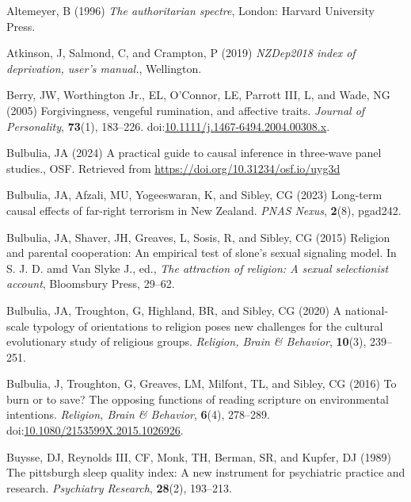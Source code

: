 \documentclass[
  single column]{article}
\newlength{\cslhangindent}
\newenvironment{CSLReferences}[2] %
 {\begin{list}{}{%
  \setlength{\itemindent}{0pt}
  \setlength{\leftmargin}{0pt}
  \setlength{\parsep}{0pt}
  \ifodd #1
   \setlength{\leftmargin}{\cslhangindent}
   \setlength{\itemindent}{-1\cslhangindent}
  \fi
  \setlength{\itemsep}{#2\baselineskip}}}
 {\end{list}}
\begin{document}
\label{refs}
\begin{CSLReferences}{1}{0}
Altemeyer, B (1996) \emph{The authoritarian spectre}, London: Harvard
University Press.

Atkinson, J, Salmond, C, and Crampton, P (2019) \emph{NZDep2018 index of
deprivation, user{'}s manual.}, Wellington.

Berry, JW, Worthington Jr., EL, O'Connor, LE, Parrott III, L, and Wade,
NG (2005) Forgivingness, vengeful rumination, and affective traits.
\emph{Journal of Personality}, \textbf{73}(1), 183--226.
doi:\href{https://doi.org/10.1111/j.1467-6494.2004.00308.x}{10.1111/j.1467-6494.2004.00308.x}.

Bulbulia, JA (2024) A practical guide to causal inference in three-wave
panel studies., OSF. Retrieved from
\url{https://doi.org/10.31234/osf.io/uyg3d}

Bulbulia, JA, Afzali, MU, Yogeeswaran, K, and Sibley, CG (2023)
Long-term causal effects of far-right terrorism in {N}ew {Z}ealand.
\emph{PNAS Nexus}, \textbf{2}(8), pgad242.

Bulbulia, JA, Shaver, JH, Greaves, L, Sosis, R, and Sibley, CG (2015)
Religion and parental cooperation: An empirical test of slone's sexual
signaling model. In S. J. D. amd Van Slyke J., ed., \emph{The attraction
of religion: A sexual selectionist account}, Bloomsbury Press, 29--62.

Bulbulia, JA, Troughton, G, Highland, BR, and Sibley, CG (2020) A
national-scale typology of orientations to religion poses new challenges
for the cultural evolutionary study of religious groups. \emph{Religion,
Brain \& Behavior}, \textbf{10}(3), 239--251.

Bulbulia, J, Troughton, G, Greaves, LM, Milfont, TL, and Sibley, CG
(2016) To burn or to save? The opposing functions of reading scripture
on environmental intentions. \emph{Religion, Brain \& Behavior},
\textbf{6}(4), 278--289.
doi:\href{https://doi.org/10.1080/2153599X.2015.1026926}{10.1080/2153599X.2015.1026926}.

Buysse, DJ, Reynolds III, CF, Monk, TH, Berman, SR, and Kupfer, DJ
(1989) The pittsburgh sleep quality index: A new instrument for
psychiatric practice and research. \emph{Psychiatry Research},
\textbf{28}(2), 193--213.


\end{CSLReferences}
\end{document}

